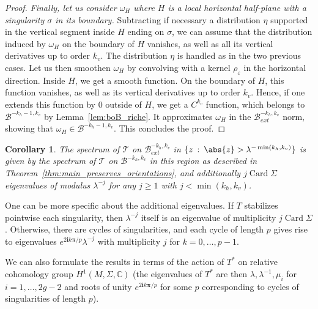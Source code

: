 \documentclass[11pt, a4paper, oneside, final, pagebackref]{amsart}
\newcommand{\boB}{\mathcal{B}}
\newcommand{\boT}{\mathcal{T}}
\newcommand{\C}{\mathbb{C}}
\newcommand{\ic}{\mathbf{i}}
\newcommand{\bpi}{\boldsymbol{\pi}}
\newcommand{\st}{\::\:}
\DeclareMathOperator{\Card}{Card}
\renewcommand{\epsilon}{\varepsilon}
\renewcommand{\geq}{\geqslant}
\newtheorem{cor}[thm]{Corollary}
\theoremstyle{definition}
\numberwithin{equation}{section}
\begin{document}
\begin{proof}
\emph{Finally, let us consider $\omega_H$ where $H$ is a local horizontal
half-plane with a singularity $\sigma$ in its boundary.} Subtracting if
necessary a distribution $\eta$ supported in the vertical segment inside $H$
ending on $\sigma$, we can assume that the distribution induced by $\omega_H$
on the boundary of $H$ vanishes, as well as all its vertical derivatives up
to order $k_v$. The distribution $\eta$ is handled as in the two previous
cases. Let us then smoothen $\omega_H$ by convolving with a kernel
$\rho_\epsilon$ in the horizontal direction. Inside $H$, we get a smooth
function. On the boundary of $H$, this function vanishes, as well as its
vertical derivatives up to order $k_v$. Hence, if one extends this function
by $0$ outside of $H$, we get a $C^{k_v}$ function, which belongs to
$\boB^{-k_h-1, k_v}$ by Lemma~\ref{lem:boB_riche}. It approximates $\omega_H$
in the $\boB_{ext}^{-k_h, k_v}$ norm, showing that $\omega_H \in
\boB^{-k_h-1, k_v}$. This concludes the proof.
\end{proof}

\begin{cor}
\label{cor:spectrum_ext} The spectrum of $\boT$ on $\boB_{ext}^{-k_h, k_v}$
in $\{z \st \abs{z}>\lambda^{-\min(k_h, k_v)}\}$ is given by the spectrum of
$\boT$ on $\boB^{-k_h, k_v}$ in this region as described in
Theorem~\ref{thm:main_preserves_orientations}, and additionally $j \Card
\Sigma$ eigenvalues of modulus $\lambda^{-j}$ for any $j\geq 1$ with
$j<\min(k_h, k_v)$.
\end{cor}
One can be more specific about the additional eigenvalues. If $T$ stabilizes
pointwise each singularity, then $\lambda^{-j}$ itself is an eigenvalue of
multiplicity $j\Card \Sigma$. Otherwise, there are cycles of singularities,
and each cycle of length $p$ gives rise to eigenvalues $e^{2\ic k\bpi/p}
\lambda^{-j}$ with multiplicity $j$ for $k=0,\dotsc, p-1$.

We can also formulate the results in terms of the action of $T^\ast$ on
relative cohomology group $H^1(M,\Sigma,\C)$ (the eigenvalues of $T^\ast$ are
then $\lambda,\lambda^{-1},\mu_i$ for $i=1,\dots,2g-2$ and roots of unity
$e^{2\ic k\bpi/p}$ for some $p$ corresponding to cycles of singularities of
length $p$).
\end{document}
